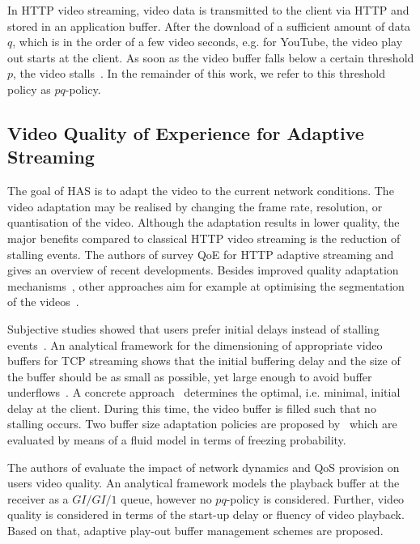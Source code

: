 In \gls{HTTP} video streaming, video data is transmitted to the client via \gls{HTTP} and stored in an application buffer.
After the download of a sufficient amount of data \(q\), which is in the order of a few video seconds, e.g. for YouTube, the video play out starts at the client.
As soon as the video buffer falls below a certain threshold \(p\), the video stalls~\cite{Hossfeld2013c}.
In the remainder of this work, we refer to this threshold policy as \(pq\)-policy.

\subsection{Video Quality of Experience for  Adaptive Streaming}\label{sec:application:background:application_qoe}
The goal of \gls{HAS} is to adapt the video to the current network conditions.
The video adaptation may be realised by changing the frame rate, resolution, or quantisation of the video. Although the adaptation results in lower quality, the major benefits compared to classical \gls{HTTP} video streaming is the reduction of stalling events.
The authors of \cite{Seufert2014} survey \gls{QoE} for \gls{HTTP} adaptive streaming and gives an overview of recent developments. 
Besides improved quality adaptation mechanisms~\cite{Sieber2013}, other approaches aim for example at optimising the segmentation of the videos~\cite{Lievens2013}.

Subjective studies showed that users prefer initial delays instead of stalling events~\cite{Hossfeld2012c}.
An analytical framework for the dimensioning of appropriate video buffers for \gls{TCP} streaming shows that the initial buffering delay and the size of the buffer should be as small as possible, yet large enough to avoid buffer underflows~\cite{Yan2011}. 
A concrete approach~\cite{Hossfeld2012b} determines the optimal, i.e. minimal, initial delay at the client.
During this time, the video buffer is filled such that no stalling occurs.
Two buffer size adaptation policies are proposed by~\cite{Fiedler2014} which are evaluated by means of a fluid model in terms of freezing probability. 

The authors of \cite{Luan2010} evaluate the impact of network dynamics and \gls{QoS} provision on users video quality. 
An analytical framework models the playback buffer at the receiver as a \(GI/GI/1\) queue, however no \(pq\)-policy is considered. 
Further, video quality is considered in terms of the start-up delay or fluency of video playback. 
Based on that, adaptive play-out buffer management schemes are proposed. 

